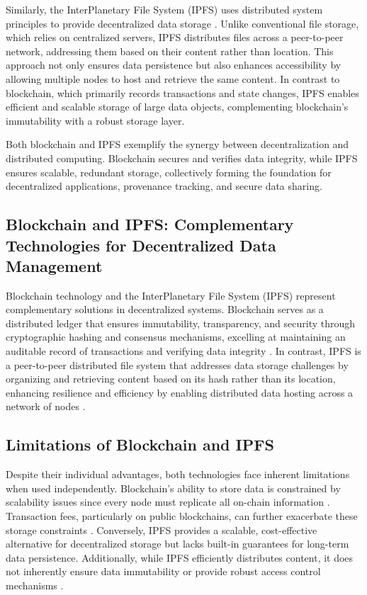 \documentclass[final]{rc-book-2.14}
\begin{document}
Similarly, the InterPlanetary File System (IPFS) uses distributed system principles to provide decentralized data storage \cite{benet2014ipfs}. Unlike conventional file storage, which relies on centralized servers, IPFS distributes files across a peer-to-peer network, addressing them based on their content rather than location. This approach not only ensures data persistence but also enhances accessibility by allowing multiple nodes to host and retrieve the same content. In contrast to blockchain, which primarily records transactions and state changes, IPFS enables efficient and scalable storage of large data objects, complementing blockchain’s immutability with a robust storage layer.

Both blockchain and IPFS exemplify the synergy between decentralization and distributed computing. Blockchain secures and verifies data integrity, while IPFS ensures scalable, redundant storage, collectively forming the foundation for decentralized applications, provenance tracking, and secure data sharing.

\subsection{Blockchain and IPFS: Complementary Technologies for Decentralized Data Management}

Blockchain technology and the InterPlanetary File System (IPFS) represent complementary solutions in decentralized systems. Blockchain serves as a distributed ledger that ensures immutability, transparency, and security through cryptographic hashing and consensus mechanisms, excelling at maintaining an auditable record of transactions and verifying data integrity \cite{nakamoto2008bitcoin}. In contrast, IPFS is a peer-to-peer distributed file system that addresses data storage challenges by organizing and retrieving content based on its hash rather than its location, enhancing resilience and efficiency by enabling distributed data hosting across a network of nodes \cite{benet2014ipfs}.

\subsection{Limitations of Blockchain and IPFS}

Despite their individual advantages, both technologies face inherent limitations when used independently. Blockchain's ability to store data is constrained by scalability issues since every node must replicate all on-chain information \cite{steichen2018}. Transaction fees, particularly on public blockchains, can further exacerbate these storage constraints \cite{easley_mining_2019}. Conversely, IPFS provides a scalable, cost-effective alternative for decentralized storage  \cite{benet2014ipfs} but lacks built-in guarantees for long-term data persistence. Additionally, while IPFS efficiently distributes content, it does not inherently ensure data immutability or provide robust access control mechanisms \cite{steichen2018}.
\end{document}
